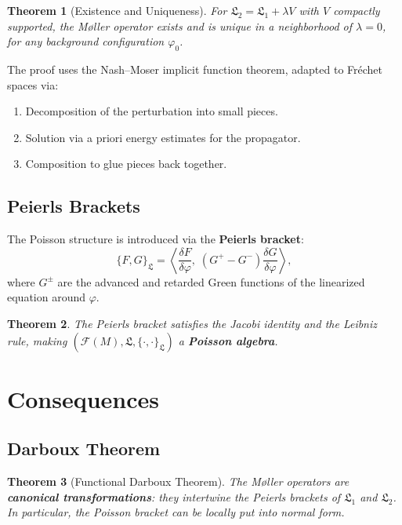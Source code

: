 \documentclass[11pt,a4paper]{article}
\newtheorem{theorem}{Theorem}[section]
\begin{document}
\begin{theorem}[Existence and Uniqueness]
For $\mathfrak{L}_2 = \mathfrak{L}_1 + \lambda V$ with $V$ compactly supported,
the M\o ller operator exists and is unique in a neighborhood of $\lambda = 0$,
for any background configuration $\varphi_0$.
\end{theorem}

The proof uses the Nash--Moser implicit function theorem, adapted to
Fr\'echet spaces via:
\begin{enumerate}[nosep]
  \item Decomposition of the perturbation into small pieces.
  \item Solution via a priori energy estimates for the propagator.
  \item Composition to glue pieces back together.
\end{enumerate}

\subsection{Peierls Brackets}

The Poisson structure is introduced via the \textbf{Peierls bracket}:
\begin{equation}
  \{F, G\}_{\mathfrak{L}} = \left\langle \frac{\delta F}{\delta\varphi},\;
  (G^+ - G^-) \frac{\delta G}{\delta\varphi} \right\rangle,
\end{equation}
where $G^\pm$ are the advanced and retarded Green functions of the
linearized equation around $\varphi$.

\begin{theorem}
The Peierls bracket satisfies the Jacobi identity and the Leibniz rule,
making $(\mathscr{F}(M), \mathfrak{L}, \{\cdot,\cdot\}_{\mathfrak{L}})$
a \textbf{Poisson algebra}.
\end{theorem}

\section{Consequences}

\subsection{Darboux Theorem}

\begin{theorem}[Functional Darboux Theorem]
The M\o ller operators are \textbf{canonical transformations}: they intertwine
the Peierls brackets of $\mathfrak{L}_1$ and $\mathfrak{L}_2$. In particular,
the Poisson bracket can be locally put into normal form.
\end{theorem}
\end{document}
